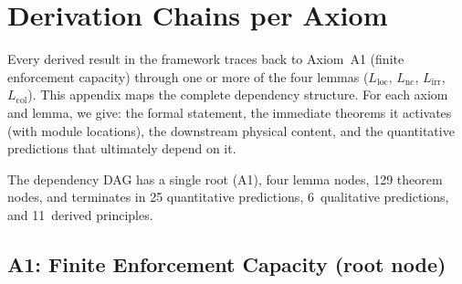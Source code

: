 \documentclass[11pt]{article}
\newcommand{\Lnc}{L_{\mathrm{nc}}}
\newcommand{\Lloc}{L_{\mathrm{loc}}}
\newcommand{\Lirr}{L_{\mathrm{irr}}}
\newcommand{\Lcol}{L_{\mathrm{col}}}
\begin{document}
\section{Derivation Chains per Axiom}

Every derived result in the framework traces back to Axiom~A1 (finite enforcement capacity) through one or more of the four lemmas ($\Lloc$, $\Lnc$, $\Lirr$, $\Lcol$).  This appendix maps the complete dependency structure.  For each axiom and lemma, we give: the formal statement, the immediate theorems it activates (with module locations), the downstream physical content, and the quantitative predictions that ultimately depend on it.

The dependency DAG has a single root (A1), four lemma nodes, 129 theorem nodes, and terminates in 25 quantitative predictions, 6~qualitative predictions, and 11~derived principles.

\subsection{A1: Finite Enforcement Capacity (root node)}
\end{document}
